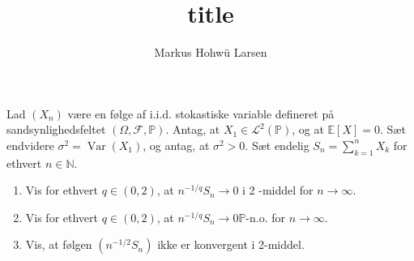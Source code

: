 \documentclass{Class}
\author{Markus Hohwü Larsen}
\title{title}
\begin{document}
Lad $\left(X_n\right)$ være en følge af i.i.d. stokastiske variable defineret på sandsynlighedsfeltet $(\Omega, \mathcal{F}, \mathbb{P})$. Antag, at $X_1 \in \mathcal{L}^2(\mathbb{P})$, og at $\mathbb{E}[X]=0$. Sæt endvidere $\sigma^2=\operatorname{Var}\left(X_1\right)$, og antag, at $\sigma^2>0$. Sæt endelig $S_n=\sum_{k=1}^n X_k$ for ethvert $n \in \mathbb{N}$.
\begin{enumerate}
    \item Vis for ethvert $q \in(0,2)$, at $n^{-1 / q} S_n \rightarrow 0$ i 2 -middel for $n \rightarrow \infty$.
    \item Vis for ethvert $q \in(0,2)$, at $n^{-1 / q} S_n \rightarrow 0 \mathbb{P}$-n.o. for $n \rightarrow \infty$.
    \item Vis, at følgen $\left(n^{-1 / 2} S_n\right)$ ikke er konvergent i 2-middel.
\end{enumerate}
\solution
\end{document}
